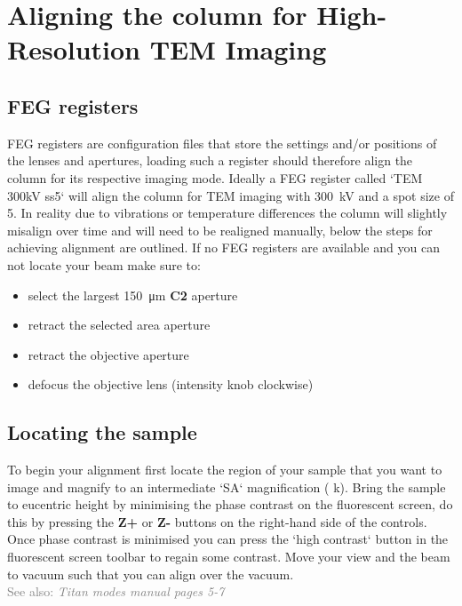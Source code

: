 \documentclass[a4paper]{scrartcl}
\begin{document}
\section*{Aligning the column for High-Resolution TEM Imaging}
\subsection*{FEG registers}
FEG registers are configuration files that store the settings and/or positions of the lenses and apertures, loading such a register should therefore align the column for its respective imaging mode. Ideally a FEG register called `TEM 300kV ss5` will align the column for TEM imaging with \SI{300}{\kilo \volt} and a spot size of 5. In reality due to vibrations or temperature differences the column will slightly misalign over time and will need to be realigned manually, below the steps for achieving alignment are outlined. If no FEG registers are available and you can not locate your beam make sure to:
\begin{itemize}
	\item select the largest \SI{150}{\micro\meter} \textbf{C2} aperture
	\item retract the selected area aperture
	\item retract the objective aperture
	\item defocus the objective lens (intensity knob clockwise)
\end{itemize}

\subsection*{Locating the sample}
To begin your alignment first locate the region of your sample that you want to image and magnify to an intermediate `SA` magnification ( k\times). Bring the sample to eucentric height by minimising the phase contrast on the fluorescent screen, do this by pressing the \textbf{Z+} or \textbf{Z-} buttons on the right-hand side of the controls. Once phase contrast is minimised you can press the `high contrast` button in the fluorescent screen toolbar to regain some contrast. Move your view and the beam to vacuum such that you can align over the vacuum.\\
\textcolor{gray}{See also: \textit{Titan modes manual pages 5-7}}
\end{document}
